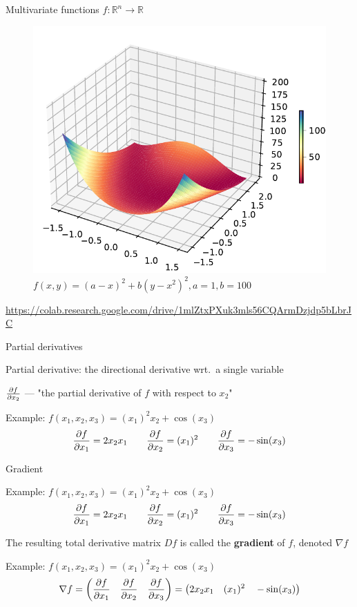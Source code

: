 \documentclass[12pt,aspectratio=169,handout]{beamer}
\begin{document}
\begin{frame}{Multivariate functions $f: \mathbb{R}^n \to \mathbb{R}$}

	\begin{figure}
		\centering
		\includegraphics[trim={0 0.1cm 0 0.8cm},clip,width=0.55\linewidth]{img/rosenbrock.pdf}
		\caption{$f(x,y)=(a-x)^{2}+b(y-x^{2})^{2}, a = 1, b = 100$}
	\end{figure}
{\tiny \url{https://colab.research.google.com/drive/1mlZtxPXuk3mls56CQArmDzjdp5bLbrJC}}

\end{frame}




\begin{frame}{Partial derivatives}
	
	Partial derivative: the directional derivative wrt.\ a single variable
	
	\bigskip
	
	$\pdv{f}{x_2}$ --- "the partial derivative of $f$ with respect to $x_2$"
	
	\bigskip
	
	\begin{block}{Example: $f(x_1, x_2, x_3) = (x_1)^2 x_2 + \cos(x_3)$}
		$$
		\pdv{f}{x_1} = 2 x_2 x_1 \qquad \pdv{f}{x_2} = (x_1)^2 \qquad \pdv{f}{x_3} = - \sin (x_3)
		$$
	\end{block}
	
	
\end{frame}


\begin{frame}{Gradient}
	
	\begin{block}{Example: $f(x_1, x_2, x_3) = (x_1)^2 x_2 + \cos(x_3)$}
		$$
		\pdv{f}{x_1} = 2 x_2 x_1 \qquad \pdv{f}{x_2} = (x_1)^2 \qquad \pdv{f}{x_3} = - \sin (x_3)
		$$
	\end{block}
	
	
	The resulting total derivative matrix $Df$ is called the \textbf{gradient} of $f$, denoted $\nabla f$
	
	\begin{block}{Example: $f(x_1, x_2, x_3) = (x_1)^2 x_2 + \cos(x_3)$}
		$$
		\nabla f = \left( \pdv{f}{x_1} \quad \pdv{f}{x_2} \quad \pdv{f}{x_3} \right) = 
		\left(
		2 x_2 x_1  \quad (x_1)^2  \quad - \sin (x_3)
		\right)
		$$
	\end{block}
	
	
\end{frame}
\end{document}
